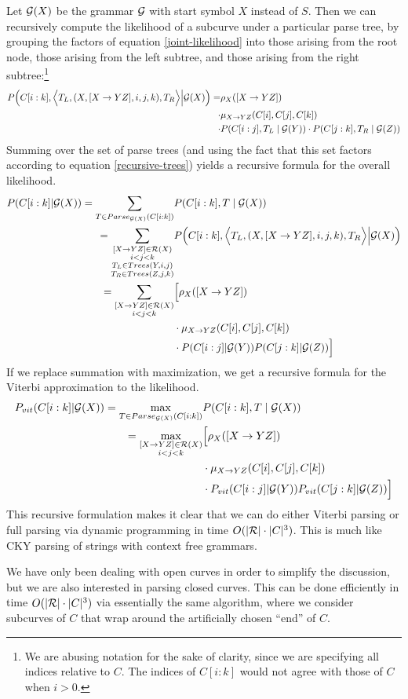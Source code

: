 Let ${\mathcal G}(X)$ be the grammar ${\mathcal G}$ with start symbol $X$ instead of
$S$. Then we can recursively compute the likelihood of a subcurve
under a particular parse tree, by grouping the factors of equation
\eqref{joint-likelihood} into those arising from the root node, those
arising from the left subtree, and those arising from the right
subtree:\footnote{We are abusing notation for the sake of clarity,
  since we are specifying all indices relative to $C$. The indices of
  $C[i:k]$ would not agree with those of $C$ when $i>0$. }
\begin{align*}
P\Big(C[i:k], \Big\langle T_L, (X, [X\to YZ], i,j,k), T_R \Big\rangle \Big| {\mathcal G}(X)\Big) = &\rho_X([X\to YZ])  \\
\cdot &\mu_{X\to YZ}(C[i],C[j],C[k]) \\
\cdot &P(C[i:j], T_L \mid {\mathcal G}(Y)) \cdot P(C[j:k], T_R \mid {\mathcal G}(Z))
\end{align*}
Summing over the set of parse trees (and using the fact that this set
factors according to equation \eqref{recursive-trees}) yields a recursive formula for the overall likelihood.
\begin{align*}
P(C[i:k] | {\mathcal G}(X)) = \sum_{T\in Parse_{{\mathcal G}(X)}(C[i:k])} & P(C[i:k], T \mid {\mathcal G}(X))\\
= \sum_{\substack{[X\to YZ] \in {\mathcal R}(X)\\i < j < k\\ T_L\in Trees(Y,i,j)\\ T_R\in Trees(Z,j,k)}} &P\Big(C[i:k], \Big\langle T_L, (X, [X\to YZ], i,j,k), T_R \Big\rangle \Big| {\mathcal G}(X)\Big)\\
= \sum_{\substack{[X\to YZ] \in {\mathcal R}(X)\\i < j < k}} &\Big[\rho_X([X\to YZ]) \\
&\cdot \mu_{X\to YZ}(C[i],C[j],C[k]) \\
&\cdot P(C[i:j] | {\mathcal G}(Y)) P(C[j:k] | {\mathcal G}(Z))\Big]
\end{align*}
If we replace summation with maximization, we get a recursive formula
for the Viterbi approximation to the likelihood.
\begin{align*}
P_{vit}(C[i:k] | {\mathcal G}(X)) = \max_{T\in Parse_{{\mathcal G}(X)}(C[i:k])} & P(C[i:k], T \mid {\mathcal G}(X))\\
= \max_{\substack{[X\to YZ] \in {\mathcal R}(X)\\i < j < k}} &\Big[\rho_X([X\to YZ]) \\
&\cdot \mu_{X\to YZ}(C[i],C[j],C[k]) \\
&\cdot P_{vit}(C[i:j] | {\mathcal G}(Y)) P_{vit}(C[j:k] | {\mathcal G}(Z))\Big]
\end{align*}
This recursive formulation makes it clear that we can do either
Viterbi parsing or full parsing via dynamic programming in time
$O(|{\mathcal R}|\cdot |C|^3)$. This is much like CKY parsing of strings with
context free grammars.

We have only been dealing with open curves in order to simplify the
discussion, but we are also interested in parsing closed curves. This
can be done efficiently in time $O(|{\mathcal R}|\cdot |C|^3)$ via
essentially the same algorithm, where we consider subcurves of $C$
that wrap around the artificially chosen ``end'' of $C$.

